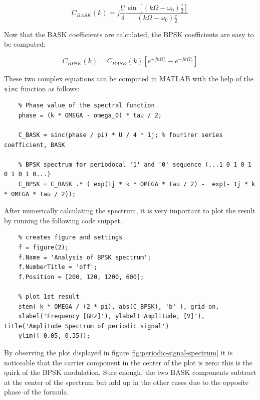 \begin{equation*}
    C_{BASK}(k) = j\frac{U}{4} \frac{\sin\left[ \left( k\Omega - \omega_0 \right) \frac{\tau}{2}\right]}{\left( k\Omega - \omega_0 \right) \frac{\tau}{2}}
\end{equation*}

\noindent Now that the BASK coefficients are calculated, the BPSK coefficients are easy to be computed:

\begin{equation*}
    C_{BPSK}(k) = C_{BASK}(k) \left[ e^{+jk\Omega\frac{\tau}{2}} - e^{-jk\Omega\frac{\tau}{2}} \right]
\end{equation*}

\noindent These two complex equations can be computed in MATLAB with the help of the \texttt{sinc} function as follows:

\begin{lstlisting}
    % Phase value of the spectral function
    phase = (k * OMEGA - omega_0) * tau / 2;

    C_BASK = sinc(phase / pi) * U / 4 * 1j; % fourirer series coefficient, BASK

    % BPSK spectrum for periodocal '1' and '0' sequence (...1 0 1 0 1 0 1 0 1 0...)
    C_BPSK = C_BASK .* ( exp(1j * k * OMEGA * tau / 2) -  exp(- 1j * k * OMEGA * tau / 2));
\end{lstlisting}

\noindent After numerically calculating the spectrum, it is very important to plot the result by running the following code snippet.

\begin{lstlisting}
    % creates figure and settings
    f = figure(2);
    f.Name = 'Analysis of BPSK spectrum';
    f.NumberTitle = 'off';
    f.Position = [200, 120, 1200, 600];
    
    % plot 1st result
    stem( k * OMEGA / (2 * pi), abs(C_BPSK), 'b' ), grid on,
    xlabel('Frequency [GHz]'), ylabel('Amplitude, [V]'), title('Amplitude Spectrum of periodic signal')
    ylim([-0.05, 0.35]);
\end{lstlisting}

\noindent By observing the plot displayed in figure\,\ref{fig:periodic-signal-spectrum} it is noticeable that the carrier component in the center of the plot is zero: this is the quirk of the BPSK modulation. Sure enough, the two BASK components subtract at the center of the spectrum but add up in the other cases due to the opposite phase of the formula. 

